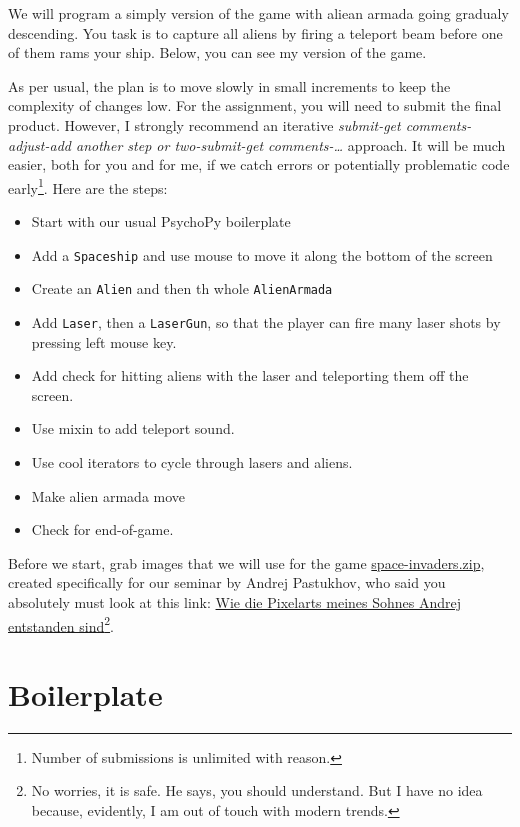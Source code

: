 \documentclass[
]{book}
\providecommand{\tightlist}{%
  \setlength{\itemsep}{0pt}\setlength{\parskip}{0pt}}
\begin{document}
We will program a simply version of the game with aliean armada going gradualy descending. You task is to capture all aliens by firing a teleport beam before one of them rams your ship. Below, you can see my version of the game.

As per usual, the plan is to move slowly in small increments to keep the complexity of changes low. For the assignment, you will need to submit the final product. However, I strongly recommend an iterative \emph{submit-get comments-adjust-add another step or two-submit-get comments-\ldots{}} approach. It will be much easier, both for you and for me, if we catch errors or potentially problematic code early\footnote{Number of submissions is unlimited with reason.}. Here are the steps:

\begin{itemize}
\tightlist
\item
  Start with our usual PsychoPy boilerplate
\item
  Add a \texttt{Spaceship} and use mouse to move it along the bottom of the screen
\item
  Create an \texttt{Alien} and then th whole \texttt{AlienArmada}
\item
  Add \texttt{Laser}, then a \texttt{LaserGun}, so that the player can fire many laser shots by pressing left mouse key.
\item
  Add check for hitting aliens with the laser and teleporting them off the screen.
\item
  Use mixin to add teleport sound.
\item
  Use cool iterators to cycle through lasers and aliens.
\item
  Make alien armada move
\item
  Check for end-of-game.
\end{itemize}

Before we start, grab images that we will use for the game \href{material/space-invaders.zip}{space-invaders.zip}, created specifically for our seminar by Andrej Pastukhov, who said you absolutely must look at this link: \href{https://youtu.be/dQw4w9WgXcQ}{Wie die Pixelarts meines Sohnes Andrej entstanden sind}\footnote{No worries, it is safe. He says, you should understand. But I have no idea because, evidently, I am out of touch with modern trends.}.

\hypertarget{boilerplate}{%
\section{Boilerplate}\label{boilerplate}}
\end{document}
